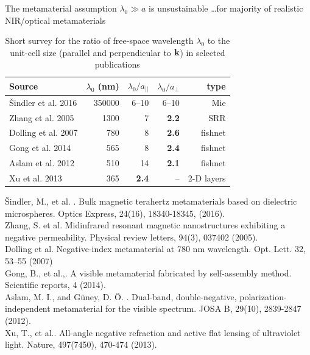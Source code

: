 \documentclass[t]{beamer} \usepackage[english]{babel} \usepackage[utf8]{inputenc} \usetheme{Frankfurt} %
\begin{document}
\begin{frame}{The metamaterial assumption $\lambda_0 \gg a$ is unsustainable}	%
	{\vspace{-.1em}\hfill \ldots for majority of realistic NIR/optical metamaterials}

\vspace{-1em}
\begin{table}[ht]   \caption{Short survey for the ratio of free-space wavelength $\lambda_0$ to the unit-cell size (parallel and perpendicular to ${\mathbf{k}}$) in selected publications}  \label{tb_} \centering 
\begin{tabular}{lrrrr}
\toprule
	Source		 & $\lambda_0$ (nm)	& $\lambda_0/a_{||}$  & $\lambda_0/a_{\perp}$ & type \\
\hline
Šindler et al. 2016  & 350000		&  6--10	& 6--10 & Mie \\
Zhang et al. 2005    & 1300			&  7        & \textbf{2.2}  & SRR \\
Dolling et al. 2007  & 780			&  8		& \textbf{2.6}  & fishnet \\
Gong et al. 2014     & 565			&  8		& \textbf{2.4}  & fishnet \\
Aslam et al. 2012    & 510			&  14		& \textbf{2.1}  & fishnet \\
Xu et al. 2013	     & 365		    & \textbf{2.4}		& --	& 2-D layers \\
\bottomrule
\end{tabular} \end{table}

	\vfill
	\tiny{	
Šindler, M., et al. . Bulk magnetic terahertz metamaterials based on dielectric microspheres. Optics Express, 24(16), 18340-18345, (2016).\\
Zhang, S. et al.  Midinfrared resonant magnetic nanostructures exhibiting a negative permeability. Physical review letters, 94(3), 037402 (2005).\\
Dolling et al. Negative-index metamaterial at 780 nm wavelength. Opt. Lett. 32, 53–55 (2007)\\
Gong, B., et al.,. A visible metamaterial fabricated by self-assembly method. Scientific reports, 4 (2014).\\
Aslam, M. I., and Güney, D. Ö. . Dual-band, double-negative, polarization-independent metamaterial for the visible spectrum. JOSA B, 29(10), 2839-2847 (2012).\\
Xu, T., et al.. All-angle negative refraction and active flat lensing of ultraviolet light. Nature, 497(7450), 470-474  (2013).}
\end{frame} 		%
\end{document}
